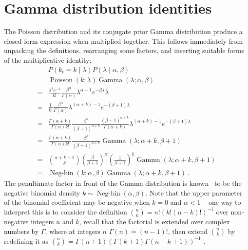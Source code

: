 \documentclass[twoside, 11pt]{article}
\DeclareMathOperator*{\gammad}{Gamma}
\DeclareMathOperator*{\poissond}{Poisson}
\DeclareMathOperator*{\negbind}{Neg-bin}
\begin{document}
\appendix

\section{Gamma distribution identities}
\label{appendix:gammaconj}

The Poisson distribution and its conjugate prior Gamma distribution produce a closed-form expression when multiplied together. This follows immediately from unpacking the definitions, rearranging some factors, and inserting suitable forms of the multiplicative identity:
\begin{align}
& P(k_t = k \mid \lambda) P(\lambda \mid \alpha, \beta)
\nonumber \\
= &
\poissond( k ; \lambda) \gammad( \lambda ; \alpha, \beta)
\nonumber \\
= &
\frac{\lambda^k e^{-\lambda}}{k!}
\frac{\beta^{\alpha}}{\Gamma(\alpha)}
\lambda^{\alpha-1} e^{-\beta \lambda}
\lambda \nonumber \\
= &
\frac{1}{k!}
\frac{\beta^{\alpha}}{\Gamma(\alpha)}
\lambda^{(\alpha+k)-1} e^{-(\beta+1) \lambda}
\nonumber \\
= &
\frac{\Gamma(\alpha+k)}{\Gamma(\alpha) k!}
\frac{\beta^{\alpha}}{(\beta+1)^{\alpha+k}}
\frac{(\beta+1)^{\alpha+k}}{\Gamma(\alpha+k)}
\lambda^{(\alpha+k)-1} e^{-(\beta+1) \lambda}
\nonumber \\
= &
\frac{\Gamma(\alpha+k)}{\Gamma(\alpha) k!}
\frac{\beta^{\alpha}}{(\beta+1)^{\alpha+k}}
\gammad(\lambda ; \alpha+k, \beta+1)
\nonumber \\
= &
\binom{\alpha+k-1}{k} \left( \frac{\beta}{\beta+1} \right)^{\alpha} \left( \frac{1}{\beta+1} \right)^{k}
\gammad(\lambda ; \alpha+k, \beta+1)
\nonumber \\
= &
\negbind(k ; \alpha, \beta)
\gammad(\lambda ; \alpha+k, \beta+1) \, .
\nonumber
\end{align}
The penultimate factor in front of the Gamma distribution is known~\citep{gelman2013bayesian} to be the negative binomial density $k \sim \negbind\left(\alpha, \beta\right)$. Note that the upper parameter of the binomial coefficient may be negative when $k=0$ and $\alpha < 1$ -- one way to interpret this is to consider the definition $\binom{n}{k} = n! (k! (n-k)!)^{-1}$ over non-negative integers $n$ and $k$, recall that the factorial is extended over complex numbers by $\Gamma$, where at integers $n$ $\Gamma(n) = (n-1)!$, then extend $\binom{n}{k}$ by redefining it as $\binom{n}{k} = \Gamma(n+1) (\Gamma(k+1) \Gamma(n-k+1))^{-1}$ .
\end{document}
